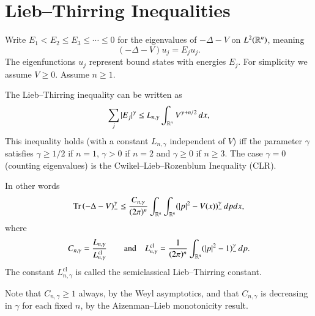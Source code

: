 \documentclass[12pt,letterpaper, reqno]{aimpl}
\begin{document}
\section{Lieb--Thirring Inequalities}

 Write $E_1 < E_2 \leq
E_3 \leq \cdots \leq 0$ for the eigenvalues of $-\Delta - V$ on
$L^2(\mathbb R^n)$, meaning
\[
(-\Delta - V)u_j = E_j u_j .
\]
The eigenfunctions $u_j$ represent bound states with energies $E_j$.
For simplicity we assume $\boxed{V \geq 0}$. Assume $n \geq 1$.

The Lieb--Thirring inequality can be written as
\[
\sum_j |E_j|^\gamma \leq L_{n,\gamma} \int_{\mathbb R^n} V^{\gamma + n/2} \,
dx ,
\]
This inequality holds (with a constant $L_{n,\gamma}$ independent of $V$) iff the parameter $\gamma$ satisfies $\gamma\geq 1/2$ if $n=1$, $\gamma>0$ if $n=2$ and $\gamma\geq 0$ if $n\geq 3$. The case $\gamma = 0$ (counting eigenvalues)
is the Cwikel--Lieb--Rozenblum Inequality (CLR).

In other words
\[
\text{Tr} \left( -\Delta - V \right)_-^\gamma \leq
\frac{C_{n,\gamma}}{(2\pi)^n} \int_{\mathbb R^n} \int_{\mathbb R^n} (|p|^2 -
V(x))_-^\gamma \, dp dx ,
\]
where
\[
C_{n,\gamma} = \frac{L_{n,\gamma}}{L^{\text{cl}}_{n,\gamma}} \qquad
\text{and} \quad L^{\text{cl}}_{n,\gamma} = \frac{1}{(2\pi)^n}
\int_{\mathbb R^n} (|p|^2-1)_-^\gamma \, dp .
\]
The constant $L^{\text{cl}}_{n,\gamma}$ is called the semiclassical
Lieb--Thirring constant.

Note that $C_{n,\gamma} \geq 1$ always, by the Weyl asymptotics, and
that $C_{n,\gamma}$ is decreasing in $\gamma$ for each fixed $n$, by
the Aizenman--Lieb monotonicity result.
\end{document}
